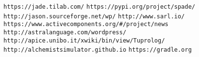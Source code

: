 \documentclass[12pt,a4paper,openright,twoside]{report}
\theoremstyle{plain}
\theoremstyle{definition}
\begin{document}
{\fancyplain{}{\bfseries\thepage}}
\begin{thesitography}{90} %
\rhead[\fancyplain{}{\bfseries \leftmark}]{\fancyplain{}{\bfseries \thepage}}


 \texttt{https://jade.tilab.com/}
 \texttt{https://pypi.org/project/spade/}
 \texttt{http://jason.sourceforge.net/wp/}
 \texttt{http://www.sarl.io/}
 \texttt{https://www.activecomponents.org/\#/project/news}
 \texttt{http://astralanguage.com/wordpress/}
 \texttt{http://apice.unibo.it/xwiki/bin/view/Tuprolog/}
 \texttt{http://alchemistsimulator.github.io}
 \texttt{https://gradle.org}
\end{thesitography}

\end{document}
